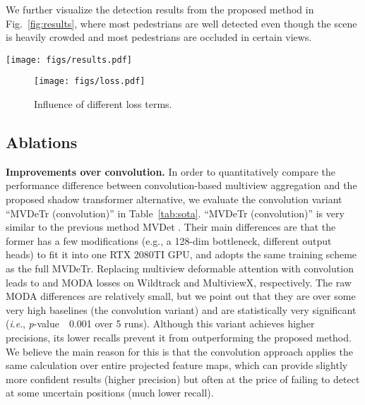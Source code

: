 \documentclass[sigconf,authorversion,nonacm]{acmart}
\newcommand{\ie}{\textit{i}.\textit{e}.}
\begin{document}
We further visualize the detection results from the proposed method in Fig.~\ref{fig:results}, where most pedestrians are well detected even though the scene is heavily crowded and most pedestrians are occluded in certain views. 


\begin{figure*}[h]
  \centering
  \texttt{[image: figs/results.pdf]}
  \caption{Detection result visualization of the proposed method. 
  }
  \label{fig:results}
\end{figure*}


\begin{figure}[h]
  \centering
  \texttt{[image: figs/loss.pdf]}
  \caption{Influence of different loss terms.
  }
  \label{fig:loss}
\end{figure}



\subsection{Ablations}
\label{secsec:ablations}

\textbf{Improvements over convolution.}
In order to quantitatively compare the performance difference between convolution-based multiview aggregation and the proposed shadow transformer alternative, we evaluate the convolution variant ``MVDeTr (convolution)'' in Table~\ref{tab:sota}. ``MVDeTr (convolution)'' is very similar to the previous method MVDet \cite{hou2020multiview}. Their main differences are that the former has a few modifications (e.g., a 128-dim bottleneck, different output heads) to fit it into one RTX 2080TI GPU, and adopts the same training scheme as the full MVDeTr. 
Replacing multiview deformable attention with convolution leads to  and  MODA losses on Wildtrack and MultiviewX, respectively. The raw MODA differences are relatively small, but we point out that they are over some very high baselines (the convolution variant) and are statistically very significant (\ie, \textit{p}-value~~0.001 over 5 runs). 
Although this variant achieves higher precisions, its lower recalls prevent it from outperforming the proposed method. We believe the main reason for this is that the convolution approach applies the same calculation over entire projected feature maps, which can provide slightly more confident results (higher precision) but often at the price of failing to detect at some uncertain positions (much lower recall). 
\end{document}

